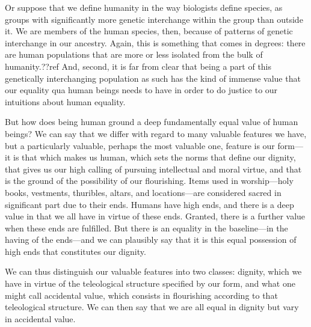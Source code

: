 Or suppose that we define humanity in the way biologists define species, as groups with significantly more genetic interchange
within the group than outside it. We are members of the human species, then, because of patterns of genetic interchange in our
ancestry. Again, this is something that comes in degrees: there are human populations that are more or less isolated from the 
bulk of humanity.??ref And, second, it is far from clear that being a part of this genetically interchanging population as such
has the kind of immense value that our equality qua human beings needs to have in order to do justice to our intuitions about
human equality.

But how does being human ground a deep fundamentally equal value of human beings? We can say that we differ with regard 
to many valuable features we have, but a particularly valuable, perhaps the most valuable one, feature is our form---it is 
that which makes us human, which sets the norms that define our dignity, that gives us our high calling of pursuing intellectual and moral virtue, and 
that is the ground of the possibility of our flourishing. Items used in  worship---holy books, vestments, thuribles, 
altars, and locations---are considered sacred in significant part due to their ends. Humans have high ends, and there is a
deep value in that we all have in virtue of these ends. Granted, there is a further value when these ends are fulfilled. 
But there is an equality in the baseline---in the having of the ends---and we can plausibly say that it is this equal
possession of high ends that constitutes our dignity. 

We can thus distinguish our valuable features into two classes: dignity, which we have in virtue of the teleological structure
specified by our form, and what one might call accidental value, which consists in flourishing according to that teleological structure.
We can then say that we are all equal in dignity but vary in accidental value. 

